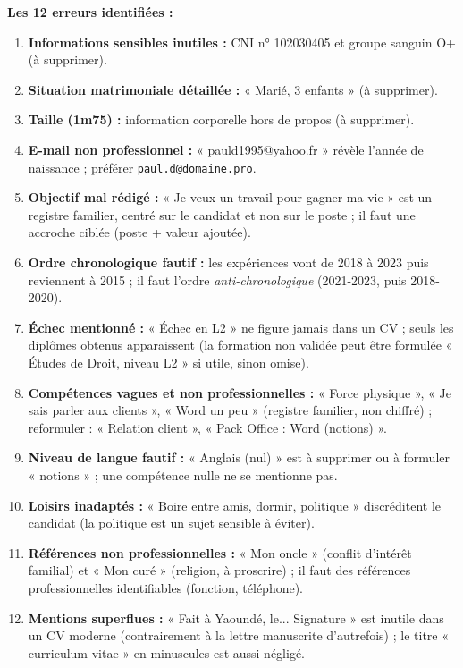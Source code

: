 \documentclass[11pt]{article}
\begin{document}
\begin{corrige}
\textbf{Les 12 erreurs identifiées :}
\begin{enumerate}
\item \textbf{Informations sensibles inutiles :} CNI n° 102030405 et groupe sanguin O+ (à supprimer).
\item \textbf{Situation matrimoniale détaillée :} « Marié, 3 enfants » (à supprimer).
\item \textbf{Taille (1m75) :} information corporelle hors de propos (à supprimer).
\item \textbf{E-mail non professionnel :} « pauld1995@yahoo.fr » révèle l'année de naissance ; préférer \texttt{paul.d@domaine.pro}.
\item \textbf{Objectif mal rédigé :} « Je veux un travail pour gagner ma vie » est un registre familier, centré sur le candidat et non sur le poste ; il faut une accroche ciblée (poste + valeur ajoutée).
\item \textbf{Ordre chronologique fautif :} les expériences vont de 2018 à 2023 puis reviennent à 2015 ; il faut l'ordre \emph{anti-chronologique} (2021-2023, puis 2018-2020).
\item \textbf{Échec mentionné :} « Échec en L2 » ne figure jamais dans un CV ; seuls les diplômes obtenus apparaissent (la formation non validée peut être formulée « Études de Droit, niveau L2 » si utile, sinon omise).
\item \textbf{Compétences vagues et non professionnelles :} « Force physique », « Je sais parler aux clients », « Word un peu » (registre familier, non chiffré) ; reformuler : « Relation client », « Pack Office : Word (notions) ».
\item \textbf{Niveau de langue fautif :} « Anglais (nul) » est à supprimer ou à formuler « notions » ; une compétence nulle ne se mentionne pas.
\item \textbf{Loisirs inadaptés :} « Boire entre amis, dormir, politique » discréditent le candidat (la politique est un sujet sensible à éviter).
\item \textbf{Références non professionnelles :} « Mon oncle » (conflit d'intérêt familial) et « Mon curé » (religion, à proscrire) ; il faut des références professionnelles identifiables (fonction, téléphone).
\item \textbf{Mentions superflues :} « Fait à Yaoundé, le... Signature » est inutile dans un CV moderne (contrairement à la lettre manuscrite d'autrefois) ; le titre « curriculum vitae » en minuscules est aussi négligé.
\end{enumerate}


\end{corrige}
\end{document}
